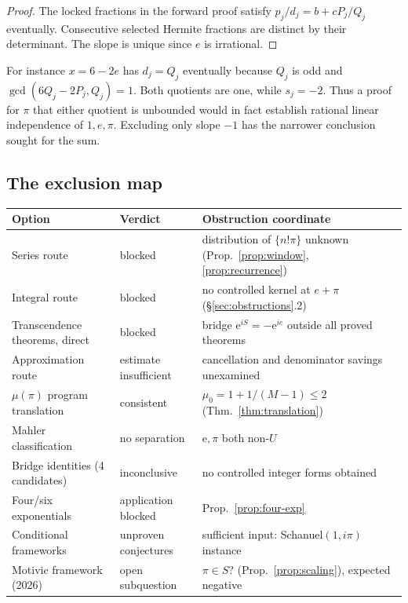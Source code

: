 \documentclass[11pt]{amsart}
\theoremstyle{definition}
\theoremstyle{remark}
\numberwithin{equation}{section}
\newcommand{\irr}{\mu}
\newcommand{\ee}{\mathrm{e}}
\begin{document}
\begin{proof}
The locked fractions in the forward proof satisfy
$p_j/d_j=b+cP_j/Q_j$ eventually. Consecutive selected Hermite
fractions are distinct by their determinant. The slope is unique
since $e$ is irrational.
\end{proof}
For instance $x=6-2e$ has $d_j=Q_j$ eventually because $Q_j$ is odd
and $\gcd(6Q_j-2P_j,Q_j)=1$. Both quotients are one, while $s_j=-2$.
Thus a proof for $\pi$ that either quotient is unbounded would in
fact establish rational linear independence of $1,e,\pi$. Excluding
only slope $-1$ has the narrower conclusion sought for the sum.
\subsection{The exclusion map}

\begin{center}
\small\begin{tabularx}{\textwidth}{@{}p{}p{}X@{}}
\toprule
Option & Verdict & Obstruction coordinate \\
\midrule
Series route & blocked & distribution of $\{n!\pi\}$ unknown (Prop.~\ref{prop:window}, \ref{prop:recurrence}) \\
Integral route & blocked & no controlled kernel at $e+\pi$ (\S\ref{sec:obstructions}.2) \\
Transcendence theorems, direct & blocked & bridge $\ee^{iS}=-\ee^{ie}$ outside all proved theorems \\
Approximation route & estimate insufficient & cancellation and denominator savings unexamined \\
$\irr(\pi)$ program translation & consistent & $\irr_0=1+1/(M-1)\le2$ (Thm.~\ref{thm:translation}) \\
Mahler classification & no separation & $\ee,\pi$ both non-$U$ \\
Bridge identities (4 candidates) & inconclusive & no controlled integer forms obtained \\
Four/six exponentials & application blocked & Prop.~\ref{prop:four-exp} \\
Conditional frameworks & unproven conjectures & sufficient input: Schanuel$(1,i\pi)$ instance \\
Motivic framework (2026) & open subquestion & $\pi\in S$? (Prop.~\ref{prop:scaling}), expected negative \\
\bottomrule
\end{tabularx}
\end{center}
\end{document}
